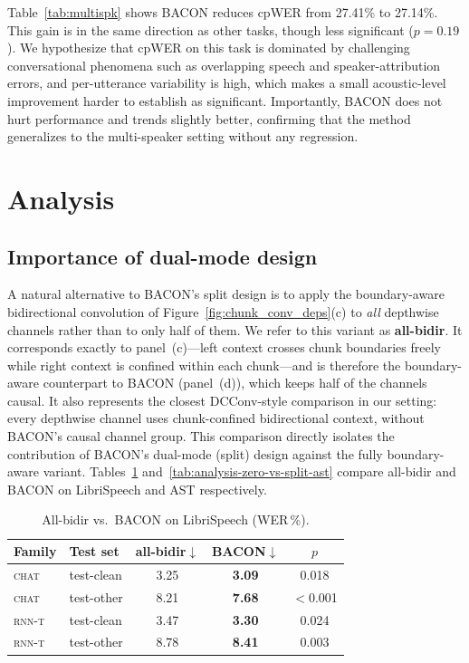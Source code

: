\documentclass[cameraready]{Interspeech}
\begin{document}
Table~\ref{tab:multispk} shows BACON reduces cpWER from 27.41\% to 27.14\%. This gain is in the same direction as other tasks, though less significant ($p=0.19$). We hypothesize that cpWER on this task is dominated by challenging conversational phenomena such as overlapping speech and speaker-attribution errors, and per-utterance variability is high, which makes a small acoustic-level improvement harder to establish as significant. Importantly, BACON does not hurt performance and trends slightly better, confirming that the method generalizes to the multi-speaker setting without any regression.




\section{Analysis}
\label{sec:analysis}

\subsection{Importance of dual-mode design}
\label{subsec:analysis-zero-vs-split}

A natural alternative to BACON's split design is to apply the boundary-aware
bidirectional convolution of Figure~\ref{fig:chunk_conv_deps}(c) to \emph{all}
depthwise channels rather than to only half of them. We refer to this variant as
\textbf{all-bidir}. It corresponds exactly to panel~(c)---left context crosses
chunk boundaries freely while right context is confined within each chunk---and
is therefore the boundary-aware counterpart to BACON (panel~(d)), which keeps
half of the channels causal. It also represents the closest DCConv-style
comparison in our setting: every depthwise channel uses chunk-confined
bidirectional context, without BACON's causal channel group. This comparison
directly isolates the contribution of BACON's dual-mode (split) design against
the fully boundary-aware variant.
Tables~\ref{tab:analysis-zero-vs-split-libri}
and~\ref{tab:analysis-zero-vs-split-ast} compare all-bidir and BACON on
LibriSpeech and AST respectively.

\begin{table}[h]
\centering
\caption{All-bidir vs.\ BACON on LibriSpeech (WER\,\%).}
\label{tab:analysis-zero-vs-split-libri}
\begin{tabular}{llccc}
\toprule
\textbf{Family} & \textbf{Test set} & \textbf{all-bidir}$\downarrow$ & \textbf{BACON}$\downarrow$ & $p$ \\
\midrule
\textsc{chat} & test-clean & 3.25 & \textbf{3.09} & 0.018 \\
\textsc{chat} & test-other & 8.21 & \textbf{7.68} & $<$0.001 \\
\midrule
\textsc{rnn-t} & test-clean & 3.47 & \textbf{3.30} & 0.024 \\
\textsc{rnn-t} & test-other & 8.78 & \textbf{8.41} & 0.003 \\
\bottomrule
\end{tabular}
\end{table}
\end{document}
